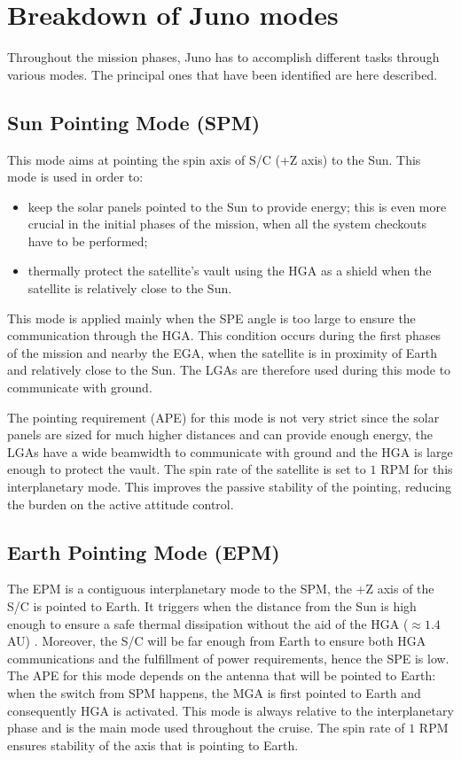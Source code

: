 \section{Breakdown of Juno modes}
\label{sec:AOCS_modes}

Throughout the mission phases, Juno has to accomplish different tasks through various modes. The principal ones that have been identified are here described.

\subsection{Sun Pointing Mode (SPM)}
\label{subsec:sun_pointing_mode}

This mode aims at pointing the spin axis of S/C (+Z axis) to the Sun. This mode is used in order to:
\begin{itemize}
    \item keep the solar panels pointed to the Sun to provide energy; this is even more crucial in the initial phases of the mission, when all the system checkouts have to be performed;
    \item thermally protect the satellite's vault using the HGA as a shield when the satellite is relatively close to the Sun.
\end{itemize}

This mode is applied mainly when the SPE angle is too large to ensure the communication through the HGA. This condition occurs during the first phases of the mission and nearby the EGA, when the satellite is in proximity of Earth and relatively close to the Sun. The LGAs are therefore used during this mode to communicate with ground.

The pointing requirement (APE) for this mode is not very strict since the solar panels are sized for much higher distances and can provide enough energy, the LGAs have a wide beamwidth to communicate with ground and the HGA is large enough to protect the vault.
The spin rate of the satellite is set to $1$ RPM for this interplanetary mode. This improves the passive stability of the pointing, reducing the burden on the active attitude control.

\subsection{Earth Pointing Mode (EPM)}
\label{subsec:earth_pointing_mode}

The EPM is a contiguous interplanetary mode to the SPM, the +Z axis of the S/C is pointed to Earth.
It triggers when the distance from the Sun is high enough to ensure a safe thermal dissipation without the aid of the HGA ($\approx 1.4$ AU) \mref.
Moreover, the S/C will be far enough from Earth to ensure both HGA communications and the fulfillment of power requirements, hence the SPE is low. The APE for this mode depends on the antenna that will be pointed to Earth: when the switch from SPM happens, the MGA is first pointed to Earth and consequently HGA is activated. This mode is always relative to the interplanetary phase and is the main mode used throughout the cruise. The spin rate of $1$ RPM ensures stability of the axis that is pointing to Earth.

